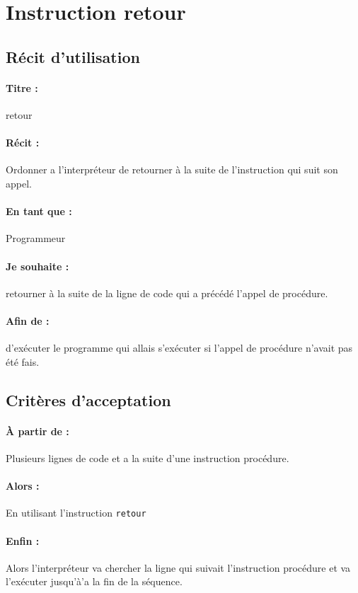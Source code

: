 \section{Instruction retour}

	\subsection*{Récit d'utilisation}

	\paragraph{Titre : } retour
	\paragraph{Récit : } Ordonner a l'interpréteur de retourner à la suite de l'instruction qui suit son appel.
	\paragraph{En tant que : } Programmeur
	\paragraph{Je souhaite : } retourner à la suite de la ligne de code qui a précédé l'appel de procédure.
	\paragraph{Afin de : } d'exécuter le programme qui allais s'exécuter si l'appel de procédure n'avait pas été fais.

	\subsection*{Critères d'acceptation}

	\paragraph{À partir de : } Plusieurs lignes de code et a la suite d'une instruction procédure.

	\paragraph{Alors : } En utilisant l'instruction \verb|retour|

	\paragraph{Enfin : } Alors l'interpréteur va chercher la ligne qui suivait l'instruction procédure et va l'exécuter jusqu'à'a la fin de la séquence.